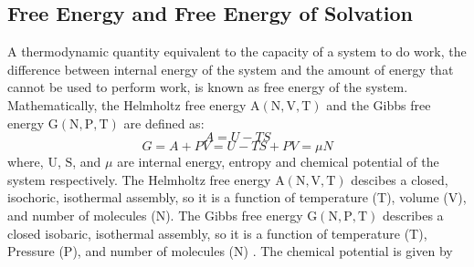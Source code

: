   \subsection{Free Energy and Free Energy of Solvation}
 A thermodynamic quantity equivalent to the capacity of a system to do work, the difference between internal energy of the system and the amount of energy that cannot be used to perform work, is  known as free energy of the system. Mathematically, the Helmholtz free energy $\mathrm{A (N, V, T)}$  and the Gibbs free energy $\mathrm{G (N, P, T)}$ are defined as:
 \begin{equation}
 A = U - T S
 \end{equation}
 \begin{equation}
 G = A + PV = U -TS + PV = \mu N
 \end{equation}
 where, $\mathrm{U}$, $\mathrm{S}$, and $\mu$ are internal energy,  entropy and chemical potential of the system respectively.  
  The Helmholtz free energy $\mathrm{A(N,V, T)}$ descibes a closed, isochoric, isothermal assembly, so it is a function of temperature (T), volume (V), and number of molecules (N). The Gibbs free energy $\mathrm{G(N,P, T)}$
 describes a closed isobaric, isothermal assembly, so it is a function of temperature (T), Pressure (P), and number of molecules (N) \cite{Pathria, Huang}. The chemical potential is given by 
 

